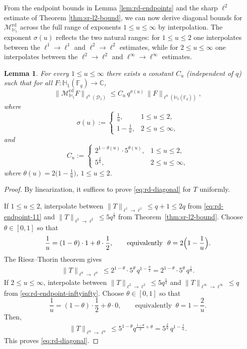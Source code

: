 \documentclass[11pt]{article}
\newtheorem{lemma}[theorem]{Lemma}
\newcommand{\1}{\mathbf 1}
\begin{document}
From the endpoint bounds in Lemma \ref{lem:rd-endpoints} and the sharp $\ell^2$ 
estimate of Theorem \ref{thm:sr-l2-bound}, we can now derive diagonal bounds for 
$\mathcal{M}^{\mathrm{rd}}_{\mathbb{H}_1}$ across the full range of exponents 
$1 \le u \le \infty$ by interpolation. The exponent $\sigma(u)$ reflects the 
two natural ranges: for $1 \le u \le 2$ one interpolates between the $\ell^1 
\to \ell^1$ and $\ell^2 \to \ell^2$ estimates, while for $2 \le u \le \infty$ 
one interpolates between the $\ell^2 \to \ell^2$ and $\ell^\infty \to \ell^\infty$ 
estimates.
\begin{lemma}\label{lem:rd-diagonal}
For every $1\le u\le\infty$ there exists a constant $C_u$ (independent of $q$) such that for all
$F:\mathbb H_1(\mathbb F_q)\to\mathbb C$,
\begin{equation}\label{eq:rd-diagonal}
\|\mathcal{M}^{\mathrm{rd}}_{\mathbb H_1}F\|_{\ell^u(\mathcal D_1)}
\le
C_u\,q^{\sigma(u)}\,\|F\|_{\ell^u(\mathbb H_1(\mathbb F_q))},
\end{equation}
where
\[
\sigma(u):=
\begin{cases}
\frac{1}{u}, & 1\le u\le 2,\\[0.3em]
1-\frac{1}{u}, & 2\le u\le\infty,
\end{cases}
\] 
and 
\[
C_u:=
\begin{cases}
2^{1-\theta(u)} \cdot  5^{\theta(u)}, & 1\le u\le 2,\\[0.3em]
5^{\frac{2}{u}} , & 2\le u\le\infty,
\end{cases}
\]
where $\theta(u)=2\big(1-\frac{1}{u} \big)$, $1 \leq u \leq 2$.
\end{lemma}

\begin{proof}
By linearization, it suffices to prove \eqref{eq:rd-diagonal} for $T$ uniformly.

If $1\le u\le 2$, interpolate between 
$\|T\|_{\ell^1\to\ell^1}\le q+1 \leq 2q$ from
\eqref{eq:rd-endpoint-11} and $\|T\|_{\ell^2\to\ell^2}\leq 5 q^{\frac{1}{2}}$
from Theorem~\ref{thm:sr-l2-bound}. Choose $\theta\in[0,1]$ so that
\[
\frac{1}{u}=(1-\theta)\cdot 1+\theta\cdot\frac{1}{2},
\qquad\text{equivalently }\ \theta=2\Bigl(1-\frac{1}{u}\Bigr).
\]
The Riesz--Thorin theorem gives 
\begin{align*}
    \|T\|_{\ell^u\to\ell^u}\leq 2^{1-\theta} \cdot 5^{\theta} \, q^{1-\frac{\theta}{2}}= 2^{1-\theta} \cdot 5^{\theta} \, q^{\frac{1}{u}}.
\end{align*}
If $2\le u\le\infty$, interpolate between $\|T\|_{\ell^2\to\ell^2}\leq 5 q^{\frac{1}{2}}$ and
$\|T\|_{\ell^\infty\to\ell^\infty}\le q$ from \eqref{eq:rd-endpoint-inftyinfty}.
Choose $\theta\in[0,1]$ so that
\[
\frac{1}{u}=(1-\theta)\cdot\frac{1}{2}+\theta\cdot 0,
\qquad\text{equivalently }\ \theta=1-\frac{2}{u}.
\]
Then, 
\begin{align*}
    \|T\|_{\ell^u\to\ell^u}\leq 5^{1-\theta} q^{\frac{1-\theta}{2}+\theta}=5^{\frac{2}{u}} \, q^{1-\frac{1}{u}}.
\end{align*}
This proves \eqref{eq:rd-diagonal}.
\end{proof}
\end{document}
